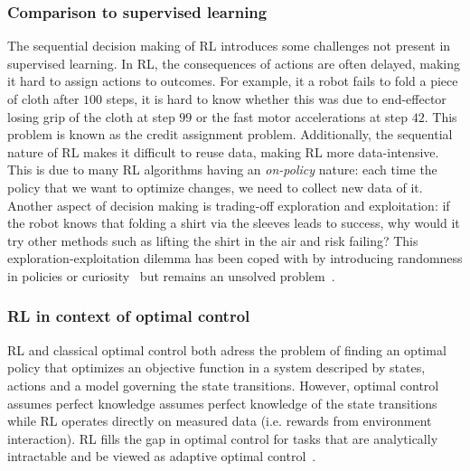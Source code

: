 \documentclass[\home/main.tex]{subfiles}
\begin{document}
\subsubsection{Comparison to supervised learning}
The sequential decision making of RL introduces some challenges not present in supervised learning.
In RL, the consequences of actions are often delayed, making it hard to assign actions to outcomes. For example, it a robot fails to fold a piece of cloth after $100$ steps, it is hard to know whether this was due to end-effector losing grip of the cloth at step $99$ or the fast motor accelerations at step $42$. This problem is known as the credit assignment problem.
Additionally, the sequential nature of RL makes it difficult to reuse data, making RL more data-intensive. This is due to many RL algorithms having an \emph{on-policy} nature: each time the policy that we want to optimize changes, we need to collect new data of it.
Another aspect of decision making is trading-off exploration and exploitation: if the robot knows that folding a shirt via the sleeves leads to success, why would it try other methods such as lifting the shirt in the air and risk failing? This exploration-exploitation dilemma has been coped with by introducing randomness in policies or curiosity~\autocite{pathak2017curiosity} but remains an unsolved problem~\autocite{Sutton2018}.

\subsubsection{RL in context of optimal control}
\Gls{RL} and classical optimal control both adress the problem of finding an optimal policy that optimizes an objective function in a system descriped by states, actions and a model governing the state transitions. However, optimal control assumes perfect knowledge assumes perfect knowledge of the state transitions while RL operates directly on measured data (i.e. rewards from environment interaction). RL fills the gap in optimal control for tasks that are analytically intractable and be viewed as adaptive optimal control~\autocite{sutton1992reinforcement}.
\end{document}
